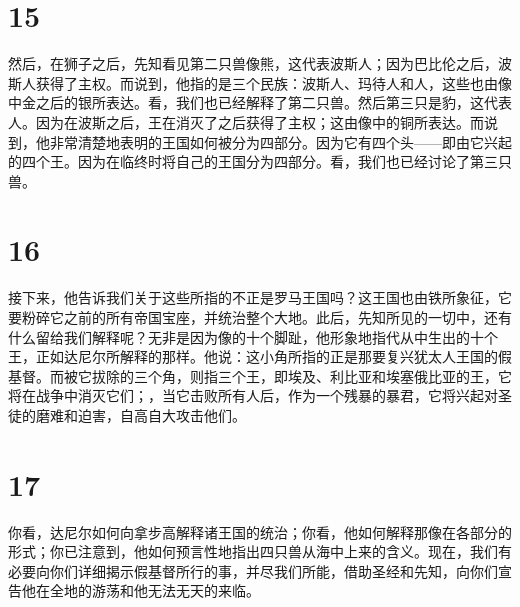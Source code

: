 
\section{15}

然后，在狮子之后，先知看见第二只兽像熊，这代表波斯人；因为巴比伦之后，波斯人获得了主权。而说到，他指的是三个民族：波斯人、玛待人和人，这些也由像中金之后的银所表达。看，我们也已经解释了第二只兽。然后第三只是豹，这代表人。因为在波斯之后，王在消灭了之后获得了主权；这由像中的铜所表达。而说到，他非常清楚地表明的王国如何被分为四部分。因为它有四个头——即由它兴起的四个王。因为在临终时将自己的王国分为四部分。看，我们也已经讨论了第三只兽。\par


\section{16}

接下来，他告诉我们关于这些所指的不正是罗马王国吗？这王国也由铁所象征，它要粉碎它之前的所有帝国宝座，并统治整个大地。此后，先知所见的一切中，还有什么留给我们解释呢？无非是因为像的十个脚趾，他形象地指代从中生出的十个王，正如达尼尔所解释的那样。他说：这小角所指的正是那要复兴犹太人王国的假基督。而被它拔除的三个角，则指三个王，即埃及、利比亚和埃塞俄比亚的王，它将在战争中消灭它们；，当它击败所有人后，作为一个残暴的暴君，它将兴起对圣徒的磨难和迫害，自高自大攻击他们。\par


\section{17}

你看，达尼尔如何向拿步高解释诸王国的统治；你看，他如何解释那像在各部分的形式；你已注意到，他如何预言性地指出四只兽从海中上来的含义。现在，我们有必要向你们详细揭示假基督所行的事，并尽我们所能，借助圣经和先知，向你们宣告他在全地的游荡和他无法无天的来临。\par

